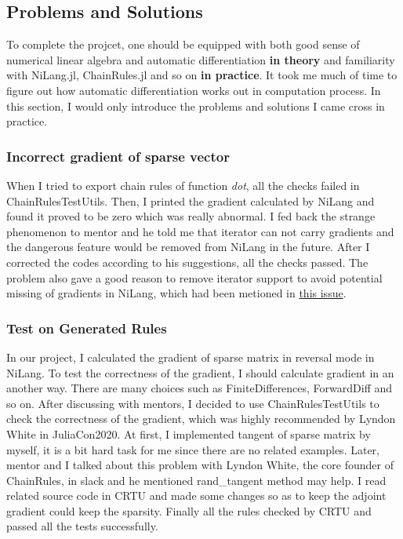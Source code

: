 \subsection{Problems and Solutions}  
To complete the projcet, one should be equipped with both good sense of numerical linear algebra and automatic differentiation \textbf{in 
theory} and familiarity with NiLang.jl, ChainRules.jl and so on \textbf{in practice}. It took me much of time to figure out how automatic 
differentiation works out in computation process. In this section, I would only introduce the problems and solutions I came cross in practice.
\subsubsection{Incorrect gradient of sparse vector}
When I tried to export chain rules of function \textit{dot}, all the checks failed in ChainRulesTestUtils.
Then, I printed the gradient calculated by NiLang and found it proved to be zero which was really abnormal. 
I fed back the strange phenomenon to mentor and he told me that iterator can not carry gradients and the dangerous feature would 
be removed from NiLang in the future. After I corrected the codes according to his suggestions, all the checks passed.
The problem also gave a good reason to remove iterator support to avoid potential missing of gradients in NiLang, which had been metioned 
in \href{https://github.com/GiggleLiu/NiLang.jl/issues/76}{this issue}.  
\subsubsection{Test on Generated Rules}
In our project, I calculated the gradient of sparse matrix in reversal mode in NiLang. To test the correctness 
of the gradient, I should calculate gradient in an another way. There are many choices such as FiniteDifferences, ForwardDiff and 
so on. After discussing with mentors, I decided to use ChainRulesTestUtils to check the correctness of the gradient, which was highly recommended by Lyndon White in JuliaCon2020. At first, I implemented tangent of 
sparse matrix by myself, it is a bit hard task for me since there are no related examples. Later, mentor and I talked about this problem with Lyndon White, the 
core founder of ChainRules, in slack and he mentioned rand\_tangent method may help. I read related source code in CRTU and made some changes so as to keep the 
adjoint gradient could keep the sparsity. Finally all the rules checked by CRTU and passed all the tests successfully. 
